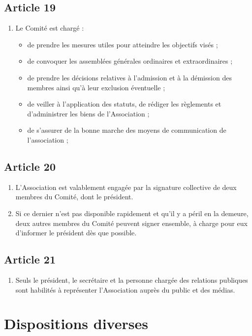 \documentclass[12pt,twoside]{report}
\begin{document}
\subsection*{Article 19}
\begin{enumerate}
\item Le Comité est chargé :
\begin{itemize}
\item de prendre les mesures utiles pour atteindre les objectifs visés ; 
\item de convoquer les assemblées générales ordinaires et extraordinaires ; 
\item de prendre les décisions relatives à l’admission et à la démission des membres ainsi qu’à leur exclusion éventuelle ; 
\item de veiller à l’application des statuts, de rédiger les règlements et d’administrer les biens de l’Association ; 
\item de s'assurer de la bonne marche des moyens de communication de l'association ; 
\end{itemize}
\end{enumerate}

\subsection*{Article 20}
\begin{enumerate}
\item L’Association est valablement engagée par la signature collective de deux membres du Comité, dont le président.

\item Si ce dernier n'est pas disponible rapidement et qu'il y a péril en la demeure, deux autres membres du Comité peuvent signer ensemble, à charge pour eux d'informer le président dès que possible.
\end{enumerate}

\subsection*{Article 21}
\begin{enumerate}
\item Seuls le président, le secrétaire et la personne chargée des relations publiques sont habilités à représenter l'Association auprès du public et des médias.
\end{enumerate}

\section*{Dispositions diverses}
\end{document}
